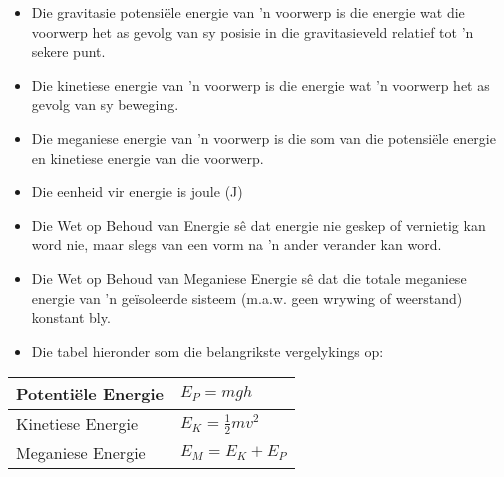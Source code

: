             \nopagebreak
      \label{m38786*id70947}\begin{itemize}[noitemsep]
            \label{m38786*uid111}\item Die gravitasie potensiële energie van  'n voorwerp is die energie wat die voorwerp het as gevolg van sy posisie in die gravitasieveld relatief tot  'n sekere punt.
\label{m38786*uid112}\item Die kinetiese energie van  'n voorwerp is die energie wat  'n voorwerp het as gevolg van sy beweging.
\label{m38786*uid113}\item Die meganiese energie van  'n voorwerp is die som van die potensiële energie en kinetiese energie van die voorwerp.
\label{m38786*uid114}\item Die eenheid vir energie is joule (J)
\label{m38786*uid115}\item Die Wet op Behoud van Energie sê dat energie nie geskep of vernietig kan word nie, maar slegs van een vorm na  'n ander verander kan word.
\label{m38786*uid116}\item Die Wet op Behoud van Meganiese Energie sê dat die totale meganiese energie van  'n geïsoleerde sisteem (m.a.w. geen wrywing of weerstand) konstant bly.
\label{m38786*uid117}\item Die tabel hieronder som die belangrikste vergelykings op:
\end{itemize}
          \begin{table}[H]
        \begin{center}
      \label{m38786*id71092}
    \noindent
      \begin{tabular}{|l|l|}\hline
        Potenti\"ele Energie &
                ${E}_{P}=mgh$
             \\ \hline
        Kinetiese Energie &
                ${E}_{K}=\frac{1}{2}m{v}^{2}$
              \\ \hline
        Meganiese Energie &
                ${E}_{M}={E}_{K}+{E}_{P}$
            \\ \hline
    \end{tabular}
      \end{center}
\end{table}
    \par
